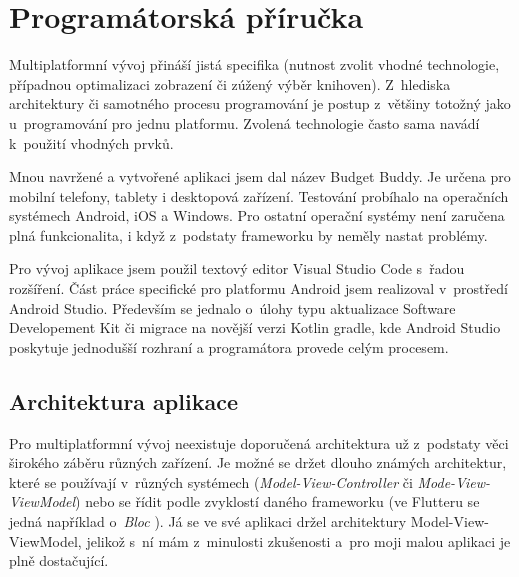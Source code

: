 \documentclass[
  biblatex,
  figures=true,
  tables=false,
  glossaries,
  index
]{kidiplom}
\begin{document}
\section{Programátorská příručka}

Multiplatformní vývoj přináší jistá specifika (nutnost zvolit vhodné technologie, případnou optimalizaci zobrazení či zúžený výběr knihoven). Z~hlediska architektury či samotného procesu programování je postup z~většiny totožný jako u~programování pro jednu platformu. Zvolená technologie často sama navádí k~použití vhodných prvků.

Mnou navržené a vytvořené aplikaci jsem dal název Budget Buddy. Je určena pro mobilní telefony, tablety i desktopová zařízení. Testování probíhalo na operačních systémech Android, iOS a Windows. Pro ostatní operační systémy není zaručena plná funkcionalita, i když z~podstaty frameworku by neměly nastat problémy.

Pro vývoj aplikace jsem použil textový editor Visual Studio Code s~řadou rozšíření. Část práce specifické pro platformu Android jsem realizoval v~prostředí Android Studio. Především se jednalo o~úlohy typu aktualizace Software Developement Kit či migrace na novější verzi Kotlin gradle, kde Android Studio poskytuje jednodušší rozhraní a programátora provede celým procesem.

\subsection{Architektura aplikace}
Pro multiplatformní vývoj neexistuje doporučená architektura už z~podstaty věci širokého záběru různých zařízení. Je možné se držet dlouho známých architektur, které se používají v~různých systémech (\textit{Model-View-Controller} či \textit{Mode-View-ViewModel}) nebo se řídit podle zvyklostí daného frameworku (ve Flutteru se jedná například o~\textit{Bloc} \cite{bloc}). Já se ve své aplikaci držel architektury Model-View-ViewModel, jelikož s~ní mám z~minulosti zkušenosti a~pro moji malou aplikaci je plně dostačující. 
\end{document}
